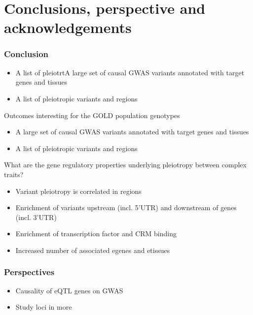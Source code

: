 \documentclass{beamer}
\begin{document}
    \section{Conclusions, perspective and acknowledgements} %

    \begin{frame}
        \frametitle{Conclusion}

        \begin{itemize}
            \item A list of pleiotrtA large set of causal GWAS variants annotated with target genes and tissues
            \item A list of pleiotropic variants and regions
        \end{itemize}

        Outcomes interesting for the GOLD population genotypes
%
        \begin{itemize}
            \item A large set of causal GWAS variants annotated with target genes and tissues
            \item A list of pleiotropic variants and regions
        \end{itemize}
%
        \vfill
%
        What are the gene regulatory properties underlying pleiotropy between complex traits?
%
        \begin{itemize}
            \item Variant pleiotropy is correlated in regions
            \item Enrichment of variants upstream (incl. 5'UTR) and downstream of genes (incl. 3'UTR)
            \item Enrichment of transcription factor and CRM binding
            \item Increased number of associated egenes and etissues
        \end{itemize}

    \end{frame}

    \begin{frame}
        \frametitle{Perspectives}

        \begin{itemize}
            \item Causality of eQTL genes on GWAS
            \item Study loci in more
        \end{itemize}

    \end{frame}
\end{document}
